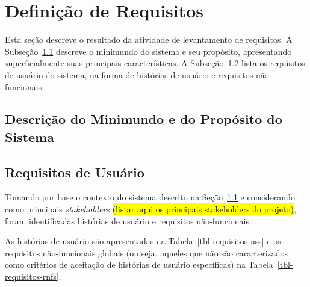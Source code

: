 \chapter{Definição de Requisitos}
\label{sec-requisitos}
\vspace{-1cm}

Esta seção descreve o resultado da atividade de levantamento de requisitos.
A Subseção~\ref{sec-requisitos-minimundo} descreve o minimundo do sistema e seu propósito, apresentando superficialmente suas principais características. 
A Subseção~\ref{sec-requisitos-usuario} lista os requisitos de usuário do sistema, na forma de histórias de usuário e requisitos não-funcionais. 




\section{Descrição do Minimundo e do Propósito do Sistema}
\label{sec-requisitos-minimundo}




\section{Requisitos de Usuário}
\label{sec-requisitos-usuario}


Tomando por base o contexto do sistema descrito na Seção~\ref{sec-requisitos-minimundo} e considerando como principais \textit{stakeholders} \hl{(listar aqui os principais stakeholders do projeto)}, foram identificadas histórias de usuário e requisitos não-funcionais.

As histórias de usuário são apresentadas na Tabela~\ref{tbl-requisitos-uss} e os requisitos não-funcionais globais (ou seja, aqueles que não são caracterizados como critérios de aceitação de histórias de usuário específicas) na Tabela~\ref{tbl-requisitos-rnfs}.

